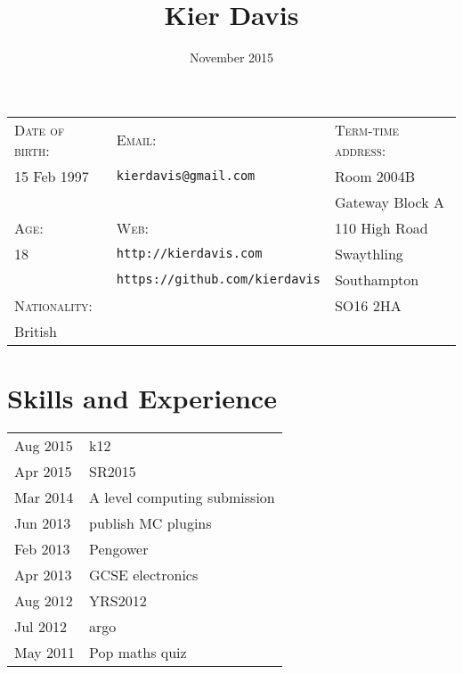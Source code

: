 \documentclass[a4paper,10pt]{article}
\title{\bfseries\Huge Kier Davis}
\author{November 2015}
\date{}
\newcommand{\heading}[1]{\section*{\centering#1}}
\begin{document}
\maketitle

\hrulefill
\vspace{1.1em}

{
\newcommand{\h}[1]{\textsc{#1}:}
\newcommand{\n}[1]{\hspace{.8em} #1}
\begin{tabu} to \textwidth {X[1,l] X[2,l] X[1.5,l]}
    \h{Date of birth}  & \h{Email}                                 & \h{Term-time address}    \\
    \n{15 Feb 1997}    & \n{\texttt{kierdavis@gmail.com}}          & \n{Room 2004B}           \\
                       &                                           & \n{Gateway Block A} \\
    \h{Age}            & \h{Web}                                   & \n{110 High Road}        \\
    \n{18}             & \n{\texttt{http://kierdavis.com}}         & \n{Swaythling}           \\
                       & \n{\texttt{https://github.com/kierdavis}} & \n{Southampton}          \\
    \h{Nationality}    &                                           & \n{SO16 2HA}             \\
    \n{British}        &                                           &                          \\
\end{tabu}
}

\hrulefill



\heading{Skills and Experience}

\begin{tabu} to \textwidth {X[1,l] X[5,l]}
    Aug 2015 & k12 \\
    Apr 2015 & SR2015 \\
    Mar 2014 & A level computing submission \\
    Jun 2013 & publish MC plugins \\
    Feb 2013 & Pengower \\
    Apr 2013 & GCSE electronics \\
    Aug 2012 & YRS2012 \\
    Jul 2012 & argo \\
    May 2011 & Pop maths quiz \\
\end{tabu}

\end{document}
